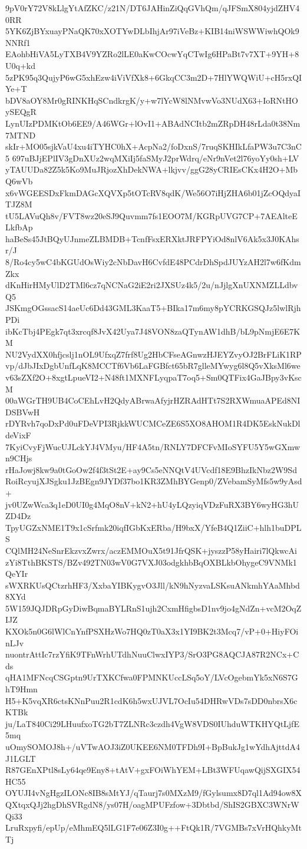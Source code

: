 9pV0rY72V8kLlgYtAfZKC/z21N/DT6JAHinZiQqGVhQm/qJFSmX804yjdZHV40RR
5YK6ZjBYxuayPNaQK70xXOTYwDLbIhjAr97iVeBz+KIB14niWSWWiwhQOk9NNRf1
EAohbHiVA5LyTXB4V9YZRo2lLE0aKwCOcwYqCTwIg6HPaBt7v7XT+9YH+8U0q+kd
5zPK95q3QujyP6wG5xhEzw4iViVfXk8+6GkqCC3m2D+7HlYWQWiU+cH5rxQIYe+T
bDV8aOY8Mr0gRINKHqSCndkrgK/y+w7lYcW8lNMvwVo3NUdX63+IoRNtHOySEQgR
LynUIzPDMKtOb6EE9/A46WGr+lOvI1+ABAdNCItb2mZRpDH48rLda0t38Nm7MTND
skIr+MO05sjkVaU4xu4iTYHC0hX+AcpNa2/foDxnS/7ruqSKHIkLfaPW3u7C3nC5
697uBJjEPlIV3gDnXUz2wqMXiIj5faSMyJ2prWdrq/eNr9nVet2l76yoYy0sh+LV
yTAUUDa82Z5k5Ko9MuJRjozXhDekNWA+lkjvv/ggG28yCRIEsCKx4H2O+MbQ6wVb
x6vWGEESDxFkmDAGcXQVXp5tOTcRV8qdK/We56O7iHjZHA6b01jZcOQdyaITJZ8M
tU5LAVuQh8v/FVT8wz20eSJ9Quvmm7fs1EOO7M/KGRpUVG7CP+7AEAlteELkfbAp
haBeSs45JtBQyUJnmeZLBMDB+TcnfFsxERXktJRFPYiOd8nlV6Ak5x3J0KAhsr/J
8/Ro4cy5wC4bKGUdOsWiy2cNbDavH6CvfdE48PCdrDhSpdJUYzAH2l7w6fKdmZkx
dKnHirHMyUlD2TMl6cz7qNCNaG2iE2ri2JXSUz4k5/2u/nJjlgXnUXNMZLLdbvQ5
JSKmgOGssacS14aeUc6Dd43GML3KaaT5+BIka17m6my8pYCRKGSQJz5lwlRjhPDi
ibKcTbj4PEgk7qt3xrcqf8JvX42Uya7J48VON8zaQTynAW1dhB/bL9pNmjE6E7KM
NU2VydXX0hfjcslj1nOL9UfxqZ7frf8Ug2HbCFseAGnwzHJEYZvyOJ2BrFLiK1RP
vp/dJbJIxDgbUnfLqK8MCCTf6Vb6LaFGBfct65bR7glleMYwyg6l8Q5vXksMl6we
v63sZXf2O+8xgtLpueVI2+N48ft1MXNFLyqpaT7oq5+Sm0QTFix4GaJBpy3vKscM
00aWGrTH9UB4CoCEhLvH2QdyABrwaAfyjrHZRAdHTt7S2RXWmuaAPEd8NIDSBVwH
rDYRvh7qoDxPd0uFDeVPI3RjkkWUCMCeZE6S5XO8AHOM1R4DK5EskNukDldeVixF
7KyiCvyFjWucUJLckYJ4VMyu/HF4A5tn/RNLY7DFCFvMIoSYFU5Y5wGXmwn9CHjs
rHaJowj8kw9a0tGoOw2f4f3tSt2E+ay9Cs5eNNQtV4UVcdf18E9BhzIkNbz2W9Sd
RoiRcyujXJSgku1JzBEgn9JYDf37bo1KR3ZMhBYGenp0/ZVebamSyMfs5w9yAsd+
jv0UZwWca3q1eD0UI0g4MqO8nV+kN2+hU4yLQzyiqVDzFuRX3BY6wyHG3hUZD4Dz
TpyUGZxNME1T9x1cSrfmk20iqfIGbKxERba/H9bxX/YfeB4Q1ZiiC+hlh1buDPLS
CQlMH24NeSnrEkzvxZwrx/aczEMMOuX5t91JfrQSK+jyszzP58yHairi7lQkwcAi
zYi8TthBKSTS/BZv492TN03wV0G7VXJ03odgkhbBqOXBLkbOhygeC9VNMk1QeYIr
sWXRKUsQCtzrhHF3/XxbaYIBKygvO3Jll/kN9hNyzvaLSKsuANkmhYAaMhbd8XYd
5W159JQJDRpGyDiwBqmaBYLRnS1ujh2CxmHfigbsD1nv9jo4gNdZn+vcM2OqZIJZ
KXOk5n0G6lWlCnYnfPSXHzWo7HQ0zT0aX3x1YI9BK2t3Mcq7/vP+0+HiyFOinLJv
nuontrAttIc7rzYfiK9TFnWrhUTdhNuuClwxIYP3/SrO3PG8AQCJA87R2NCx+Cds
qHA1MFNcqCSGptn9UrTXKCfwa0FPMNKUccLSq5oY/LVcOgebmYk5xN6S7GhT9Hmn
H5+K5vqXR6ctsKNnPuu2R1cdK6h5wxUJVL7OcIu54DHRwVDs7sDD0nbrsX6cKTBk
ju/LaT840Ci29LHuufxoTG2bT7ZLNRc3czdh4VgW8VDS0IUhduWTKHYQtLjfE5mq
uOmySOMOJ8h+/uVTwAOJ3iZ0UKEE6NM0TFDh9I+BpBukJg1wYdhAjttdA4J1LGLT
R87GEnXPtl8sLy64qe9Eny8+tAtV+gxFOiWhYEM+LBt3WFUqawQijSXGIX54HC55
OYUJI4vNgHgzILONc8IB8sMtYJ/qTaurj7s0MXzM9/fGylsumx8D7ql1Ad94ow8X
QXtqxQJj2hgDhSVRgdN8/ys07H/oagMPUFzfow+3Dbtbd/ShIS2GBXC3WNrWQi33
LruRxpyfi/epUp/eMhmEQ5lLG1F7e06Z3I0g++FtQk1R/7VGMBs7xVrHQhkyMtTj
